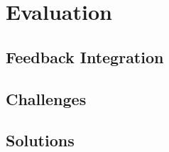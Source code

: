 
\chapter{Evaluation} %
\label{chap:benchmarks}

\section{Feedback Integration}

\section{Challenges}

\section{Solutions}

